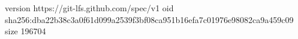 version https://git-lfs.github.com/spec/v1
oid sha256:dba22b38c3a0f61d099a2539f3bf08ca951b16efa7c01976e98082ca9a459c09
size 196704
